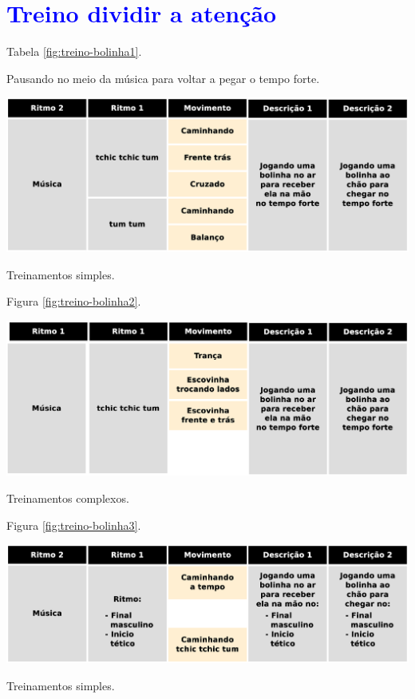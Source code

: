 
\section{\textcolor{blue}{ Treino dividir  a atenção}}


Tabela \ref{fig:treino-bolinha1}.

Pausando no meio da música para voltar a pegar o tempo forte.

\begin{table}[!h]
  \centering
    \includegraphics[width=1.0\textwidth]{chapters/cap-body-control/treino-bolinha1.eps}
\caption{Treinamentos simples.}
\label{fig:treino-bolinha1}
\end{table}

Figura \ref{fig:treino-bolinha2}.

\begin{table}[!h]
  \centering
    \includegraphics[width=1.0\textwidth]{chapters/cap-body-control/treino-bolinha2.eps}
\caption{Treinamentos complexos.}
\label{fig:treino-bolinha2}
\end{table}

Figura \ref{fig:treino-bolinha3}.

\begin{table}[!h]
  \centering
    \includegraphics[width=1.0\textwidth]{chapters/cap-body-control/treino-bolinha3.eps}
\caption{Treinamentos simples.}
\label{fig:treino-bolinha3}
\end{table}


